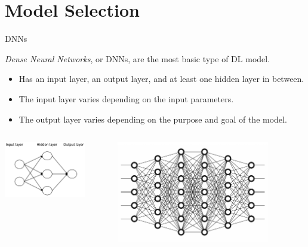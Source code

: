 \documentclass[10pt]{beamer}
\begin{document}
\section{Model Selection}


\begin{frame}{DNNs}

\textit{Dense Neural Networks}, or DNNs, are the most basic type of DL model.
\begin{itemize}
	\item Has an input layer, an output layer, and at least one hidden layer in between.
	\item The input layer varies depending on the input parameters.
	\item The output layer varies depending on the purpose and goal of the model.
\end{itemize}
\vspace{0.5cm}
\begin{columns}
	\begin{center} \includegraphics[width=0.8\textwidth]{figures/dnn-simple} \end{center}
	\begin{center} \includegraphics[width=0.8\textwidth]{figures/dnn-complex} \end{center}
\end{columns}
\end{frame}
\end{document}
